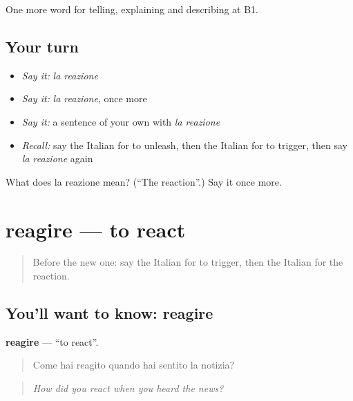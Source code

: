 \begin{grammarlens}[title={What you've built}]
One more word for telling, explaining and describing at B1.
\end{grammarlens}

\subsection*{Your turn}
\begin{itemize}
\raggedright
  \item \emph{Say it:} \emph{la reazione}
  \item \emph{Say it:} \emph{la reazione}, once more
  \item \emph{Say it:} a sentence of your own with \emph{la reazione}
  \item \emph{Recall:} say the Italian for to unleash, then the Italian for to trigger, then say \emph{la reazione} again
\end{itemize}

\begin{tcolorbox}[breakable,colback=teal!4,colframe=teal!35!black,title={Before you move on}]
What does la reazione mean? (\textquotedblleft{}The reaction\textquotedblright{}.) Say it once more.
\end{tcolorbox}
\section[reagire]{reagire — to react}

\label{lesson:IT-C353-reagire}



\begin{quote}
Before the new one: say the Italian for to trigger, then the Italian for the reaction.
\end{quote}

\subsection*{You'll want to know: reagire}
\textbf{reagire} — \textquotedblleft{}to react\textquotedblright{}.

\begin{quote}
Come hai reagito quando hai sentito la notizia?
\end{quote}

\begin{quote}
\emph{How did you react when you heard the news?}
\end{quote}

